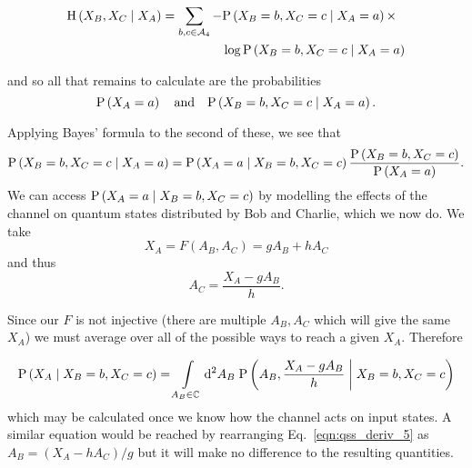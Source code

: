 \begin{align}
\text{H}\left(X_B, X_C \given X_A\right) = \sum_{b, c \in \mathcal{A}_4} - &\text{P}\left(X_B=b, X_C=c \given X_A=a\right) \times \notag \\
%
&\log \text{P}\left(X_B=b, X_C=c \given X_A=a\right)
\end{align}

\noindent and so all that remains to calculate are the probabilities \begin{equation}
\text{P}\left(X_A=a\right) \qq{and} \text{P}\left(X_B=b, X_C=c \given X_A=a\right).
\end{equation}

\noindent Applying Bayes' formula to the second of these, we see that
\begin{equation}
\text{P}\left(X_B=b, X_C=c \; \middle| \; X_A=a\right) = \text{P}\left(X_A=a \; \middle| \; X_B=b, X_C=c\right) \frac{\text{P}\left(X_B=b, X_C=c\right)}{\text{P}\left(X_A=a\right)}.
\end{equation}
We can access $\text{P}\left(X_A=a \; \middle| \; X_B=b, X_C=c\right)$ by modelling the effects of the channel on quantum states distributed by Bob and Charlie, which we now do. We take
\begin{equation}\label{eqn:qss_deriv_5}
X_A = F\left(A_B, A_C\right) = g A_B + h A_C
\end{equation}
and thus
\begin{equation}
A_C = \frac{X_A - g A_B}{h}.
\end{equation}

\noindent Since our $F$ is not injective (there are multiple $A_B, A_C$ which will give the same $X_A$) we must average over all of the possible ways to reach a given $X_A$. Therefore

\begin{equation}
\text{P}\left(X_A \; \middle| \; X_B=b, X_C=c\right) = \int\limits_{A_B \in \mathbb{C}} \mathop{}\!\mathrm{d^2} A_B \; \text{P}\left(A_B , \frac{X_A - g A_B}{h} \; \middle| \; X_B=b, X_C=c\right)
\end{equation}
which may be calculated once we know how the channel acts on input states. A similar equation would be reached by rearranging Eq.~\ref{eqn:qss_deriv_5} as $A_B = \left(X_A - h A_C\right)/g$ but it will make no difference to the resulting quantities.

